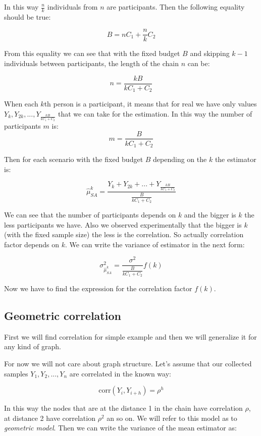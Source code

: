 \documentclass[12pt]{report}
\begin{document}
In this way $\frac{n}{k}$ individuals from $n$ are participants. Then the following equality should be true:

$$B = nC_1 + \frac{n}{k}C_2$$

From this equality we can see that with the fixed budget $B$ and skipping $k-1$ individuals between participants, the length of the chain $n$ can be:

$$n = \frac{kB}{kC_1 + C_2}$$

When each $k$th person is a participant, it means that for real we have only values $Y_k, Y_{2k}, ..., Y_{\frac{kB}{kC_1 + C_2}}$ that we can take for the estimation. In this way the number of participants $m$ is:
$$m = \frac{B}{kC_1 + C_2}$$

Then for each scenario with the fixed budget $B$ depending on the $k$ the estimator is:

$$ \widehat{\mu}_{SA}^k = \frac{Y_k+ Y_{2k}+ ...+ Y_{\frac{kB}{kC_1 + C_2}}}{\frac{B}{kC_1 + C_2}}$$


We can see that the number of participants depends on $k$ and the bigger is $k$ the less participants we have.
Also we observed experimentally that the bigger is $k$ (with the fixed sample size) the less is the correlation. So actually correlation factor  depends on $k$.
We can write the variance of estimator in the next form:

$$ \sigma^2_{\hat{\mu}_{SA}^k} = \frac{\sigma^2}{\frac{B}{kC_1 + C_2}} f(k)$$


Now we have to find the expression for the correlation factor $f(k)$.

\subsection{Geometric correlation}

First we will find correlation for simple example and then we will generalize it for any kind of graph.

For now we will not care about graph structure. Let's assume that our collected samples $Y_1, Y_2, ..., Y_n$ are correlated in the known way:

 $$\mathrm{corr}(Y_i, Y_{i+h}) = \rho^h$$

In this way the nodes that are at the distance 1 in the chain have correlation $\rho$, at distance 2 have correlation $\rho^2$ an so on. We will refer to this model as to \textit{geometric model}.
Then we can write the variance of the mean estimator as: 
\end{document}

